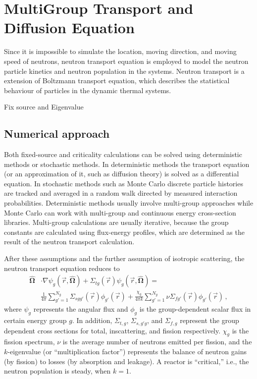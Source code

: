 
\cleardoublepage

\chapter{MultiGroup Transport and Diffusion Equation}
\label{makereference2}
Since it is impossible to simulate the location, moving direction, and moving speed of neutrons, neutron transport equation is employed to model the neutron particle kinetics and neutron population in the systems.
Neutron transport is a extension of Boltzmann transport equation, which describes the statistical behaviour of particles in the dynamic thermal systems.

Fix source and Eigenvalue

\section{Numerical approach}
Both fixed-source and criticality calculations can be solved using deterministic methods or stochastic methods. In deterministic methods the transport equation (or an approximation of it, such as diffusion theory) is solved as a differential equation. In stochastic methods such as Monte Carlo discrete particle histories are tracked and averaged in a random walk directed by measured interaction probabilities. Deterministic methods usually involve multi-group approaches while Monte Carlo can work with multi-group and continuous energy cross-section libraries. Multi-group calculations are usually iterative, because the group constants are calculated using flux-energy profiles, which are determined as the result of the neutron transport calculation.



After these assumptions and the further assumption of isotropic scattering, the neutron transport equation reduces to
\begin{equation}
\begin{split}
  \bm{\hat{\Omega}} & \cdot \nabla \psi_g(\vec{r},\bm{\hat{\Omega}}) +
    \Sigma_{t g}(\vec{r}) \psi_{g}(\vec{r},\bm{\hat{\Omega}}) = \\
   & \frac{1}{4\pi} \sum\limits^{N_g}_{g'=1} \Sigma_{s g g'}(\vec{r}) \phi_{g'}(\vec{r}) +
    \frac{\chi_g}{4\pi k} \sum\limits^{N_g}_{g'=1} \nu\Sigma_{fg'}(\vec{r}) \phi_{g'}(\vec{r}) \, ,
\end{split}
\label{eq:transport}
\end{equation}
where $\psi_g$ represents the angular flux and $\phi_g$ is the 
group-dependent scalar flux in certain energy group $g$.  
In addition, $\Sigma_{t,g}$, $\Sigma_{s,g\prime g}$, and $\Sigma_{f,g}$ represent the group dependent cross sections for total, inscattering, and fission respectively.  
$\chi_g$ is the fission spectrum, $\nu$ is the average number of neutrons emitted per fission, and the $k$-eigenvalue (or ``multiplication factor'') represents the balance of neutron gains (by fission) to losses (by absorption and leakage).  A reactor is ``critical,'' i.e., the neutron population is steady, when $k=1$.

